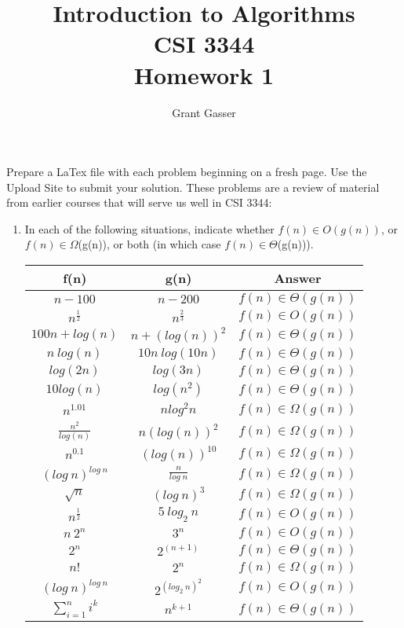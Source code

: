 \documentclass[12pt]{article}
\title{Introduction to Algorithms\\CSI 3344\\ Homework 1}
\author{Grant Gasser}
\begin{document}
\maketitle 

Prepare a LaTex file with each problem beginning on a fresh page.
Use the Upload Site to submit your solution. These problems are a review of material from earlier courses that will serve us well in CSI 3344:

\begin{enumerate}
\newpage
\item In each of the following situations, indicate whether $f(n)  \in  O(g(n))$, or $f(n)  \in \Omega$(g(n)), or both (in which case $f(n)  \in \Theta$(g(n))).


	\renewcommand{\arraystretch}{1.5}
	\begin{tabular}{|c|c|c|}\hline
		f(n) &  g(n) & Answer  \\ \hline
		$n - 100$ &  $n - 200$  & $f(n) \in \Theta(g(n))$ \\ \hline
		$n^\frac{1}{2} $ &  $n^\frac{2}{3} $  & $f(n) \in O(g(n))$\\ \hline
		$100n + log(n) $ &  $ n + (log (n))^2$  & $f(n) \in \Theta(g(n))$ \\ \hline
		$ n~log(n) $ &  $ 10n~log (10n)$  &$f(n) \in \Theta(g(n))$ \\ \hline
		$log (2n) $ &  $ log (3n)$  &$f(n) \in \Theta(g(n))$ \\ \hline
		$10 log(n)  $ &  $ log(n^2)$  & $f(n) \in \Theta(g(n))$\\ \hline
		$n^{1.01}  $ &  $ n log^2 n$ & $f(n) \in \Omega(g(n))$\\ \hline
		$\frac{n^2}{log (n)} $ &  $n(log(n))^2 $  & $f(n) \in \Omega(g(n))$\\ \hline
		$n^{0.1}  $ &  $ (log(n))^{10}$  & $f(n) \in \Omega(g(n))$\\ \hline
		$(log ~n)^{log ~n} $ &  $ \frac{n}{log ~n}$  & $f(n) \in \Omega(g(n))$\\ \hline
		$\sqrt{n} $ &  $  (log ~n)^3$  & $f(n) \in \Omega(g(n))$\\ \hline
		$n^{\frac{1}{2}} $ &  $ 5~log_2 ~n$  & $f(n) \in O(g(n))$\\ \hline
		$n~2^n $ &  $3^n $  & $f(n) \in O(g(n))$\\ \hline
		$2^n $ &  $ 2^{(n+1)}$  & $f(n) \in \Theta(g(n))$\\ \hline
		$n! $ &  $ 2^n $  & $f(n) \in \Omega(g(n))$\\ \hline
		$(log ~n)^{log ~n} $ &  $ 2^{(log_2 ~n)^2}$  & $f(n) \in O(g(n))$\\ \hline		
		$\sum_{i=1}^{n} i^k $ &  $ n^{k+1}$  &$f(n) \in \Theta(g(n))$ \\ \hline
	\end{tabular}



\end{enumerate}
\end{document}

